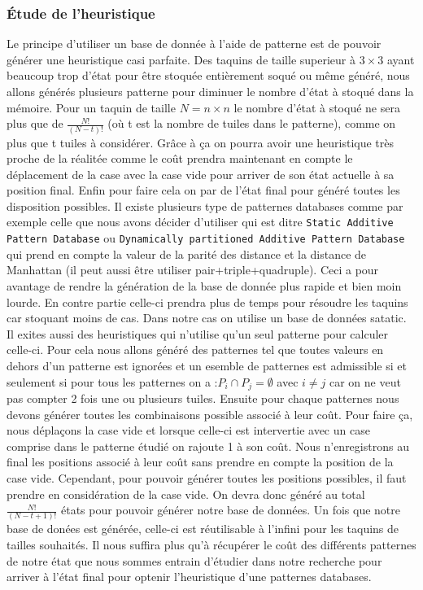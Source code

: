 \documentclass[a4paper, 12pt]{article}
\begin{document}
\subsubsection{Étude de l'heuristique}
Le principe d'utiliser un base de donnée à l'aide de patterne est de pouvoir générer une heuristique casi parfaite. Des taquins de taille superieur à $3 \times 3$ ayant beaucoup trop d'état pour être stoquée entièrement soqué ou même généré, nous allons générés plusieurs patterne pour diminuer le nombre d'état à stoqué dans la mémoire. Pour un taquin de taille $N = n \times n$ le nombre d'état à stoqué ne sera plus que de $\frac{N!}{(N-t)!}$ (où t est la nombre de tuiles dans le patterne), comme on plus que t tuiles à considérer. Grâce à ça on pourra avoir une heuristique très proche de la réalitée comme le coût prendra maintenant en compte le déplacement de la case avec la case vide pour arriver de son état actuelle à sa position final. Enfin pour faire cela on par de l'état final pour généré toutes les disposition possibles.
Il existe plusieurs type de patternes databases comme par exemple celle que nous avons décider d'utiliser qui est ditre \lstinline{Static Additive Pattern Database} ou \lstinline{Dynamically partitioned Additive Pattern Database} qui prend en compte la valeur de la parité des distance et la distance de Manhattan (il peut aussi être utiliser pair+triple+quadruple). Ceci a pour avantage de rendre la génération de la base de donnée plus rapide et bien moin lourde. En contre partie celle-ci prendra plus de temps pour résoudre les taquins car stoquant moins de cas. Dans notre cas on utilise un base de données satatic. Il exites aussi des heuristiques qui n'utilise qu'un seul patterne pour calculer celle-ci. Pour cela nous allons généré des patternes tel que toutes valeurs en dehors d'un patterne est ignorées et un esemble de patternes est admissible si et seulement si pour tous les patternes on a :$P_{i} \cap P_{j} = \emptyset$ avec $i \neq j$ car on ne veut pas compter 2 fois une ou plusieurs tuiles. Ensuite pour chaque patternes nous devons générer toutes les combinaisons possible associé à leur coût. Pour faire ça, nous déplaçons la case vide et lorsque celle-ci est intervertie avec un case comprise dans le patterne étudié on rajoute 1 à son coût. Nous n'enregistrons au final les positions associé à leur coût sans prendre en compte la position de la case vide. Cependant, pour pouvoir générer toutes les positions possibles, il faut prendre en considération de la case vide. On devra donc généré au total $\frac{N!}{(N-t+1)!}$ états pour pouvoir générer notre base de données.
Un fois que notre base de donées est générée, celle-ci est réutilisable à l'infini pour les taquins de tailles souhaités. Il nous suffira plus qu'à récupérer le coût des différents patternes de notre état que nous sommes entrain d'étudier dans notre recherche pour arriver à l'état final pour optenir l'heuristique d'une patternes databases.
\end{document}
